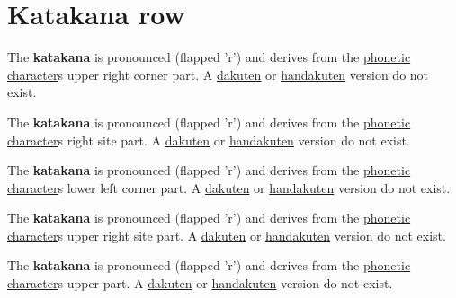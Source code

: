 \section{Katakana  row}\label{sec:KatakanaRaRow}


 The  \textbf{katakana}  is pronounced  
(flapped 'r') and  derives from the \hyperref[sec:PhoneticCharacter]{phonetic
character}s  upper right corner part.  A
\hyperref[sec:Dakuten]{dakuten}  or \hyperref[sec:Handakuten]{handakuten}
version  do not exist.


 The  \textbf{katakana}  is pronounced  
(flapped 'r') and  derives from the \hyperref[sec:PhoneticCharacter]{phonetic
character}s   right site part.  A
\hyperref[sec:Dakuten]{dakuten}  or \hyperref[sec:Handakuten]{handakuten}
version  do not exist.


 The  \textbf{katakana}  is pronounced  
(flapped 'r') and  derives from the \hyperref[sec:PhoneticCharacter]{phonetic
character}s  lower left corner part.  A
\hyperref[sec:Dakuten]{dakuten}  or \hyperref[sec:Handakuten]{handakuten}
version  do not exist.

 The  \textbf{katakana}  is pronounced  
(flapped 'r') and  derives from the \hyperref[sec:PhoneticCharacter]{phonetic
character}s  upper right site part.  A
\hyperref[sec:Dakuten]{dakuten}  or \hyperref[sec:Handakuten]{handakuten}
version  do not exist.

 The  \textbf{katakana}  is pronounced  
(flapped 'r') and  derives from the \hyperref[sec:PhoneticCharacter]{phonetic
character}s  upper part.  A \hyperref[sec:Dakuten]{dakuten}
or \hyperref[sec:Handakuten]{handakuten} version  do not exist.



\newpage

